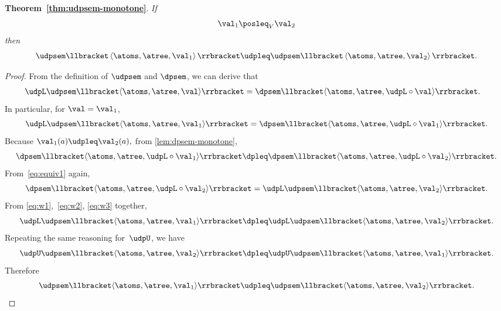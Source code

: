 \textbf{Theorem~\ref{thm:udpsem-monotone}}. \emph{If
    \[
        \val_{1}\posleq_{V}\val_{2}
    \]
    then
    \[
        \udpsem\llbracket\left\langle \atoms,\atree,\val_{1}\right\rangle \rrbracket\udpleq\udpsem\llbracket\left\langle \atoms,\atree,\val_{2}\right\rangle \rrbracket.
    \]
}
\begin{proof}
    From the definition of $\udpsem$ and $\dpsem$, we can derive that
    \begin{align}
        \udpL\udpsem\llbracket\langle\atoms,\atree,\val\rangle\rrbracket & =\dpsem\llbracket\langle\atoms,\atree,\udpL\circ\val\rangle\rrbracket.
        \label{eq:equiv1}
    \end{align}
    In particular, for $\val=\val_{1}$,
    \begin{equation}
        \udpL\udpsem\llbracket\langle\atoms,\atree,\val_{1}\rangle\rrbracket=\dpsem\llbracket\langle\atoms,\atree,\udpL\circ\val_{1}\rangle\rrbracket.
        \label{eq:w1}
    \end{equation}
    Because $\val_{1}(a)\udpleq\val_{2}(a),$ from \cref{lem:dpsem-monotone},
    \begin{equation}
        \dpsem\llbracket\langle\atoms,\atree,\udpL\circ\val_{1}\rangle\rrbracket\dpleq\dpsem\llbracket\langle\atoms,\atree,\udpL\circ\val_{2}\rangle\rrbracket.
        \label{eq:w2}
    \end{equation}
    From~\cref{eq:equiv1} again,
    \begin{equation}
        \dpsem\llbracket\langle\atoms,\atree,\udpL\circ\val_{2}\rangle\rrbracket=\udpL\udpsem\llbracket\langle\atoms,\atree,\val_{2}\rangle\rrbracket.
        \label{eq:w3}
    \end{equation}
    From \cref{eq:w1},~\cref{eq:w2}, \cref{eq:w3} together,
    \[
        \udpL\udpsem\llbracket\langle\atoms,\atree,\val_{1}\rangle\rrbracket\dpleq\udpL\udpsem\llbracket\langle\atoms,\atree,\val_{2}\rangle\rrbracket.
    \]
    Repeating the same reasoning for~$\udpU$, we have
    \[
        \udpU\udpsem\llbracket\langle\atoms,\atree,\val_{2}\rangle\rrbracket\dpleq\udpU\udpsem\llbracket\langle\atoms,\atree,\val_{1}\rangle\rrbracket.
    \]
    Therefore
    \[
        \udpsem\llbracket\langle\atoms,\atree,\val_{1}\rangle\rrbracket\udpleq\udpsem\llbracket\langle\atoms,\atree,\val_{2}\rangle\rrbracket.
    \]
\end{proof}

\vfill\pagebreak


